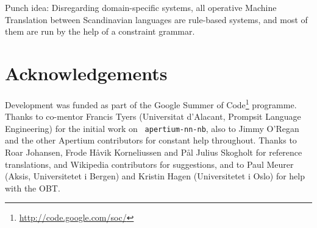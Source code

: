\documentclass[11pt]{article}
\newcommand{\comment}[1]{\textbf{SKRIV} {\it #1}}
\renewcommand{\comment}[1]{}
\begin{document}
\comment{den der mangla litt...punch. me treng ein slutt!}

Punch idea: Disregarding domain-specific systems, all operative Machine 
Translation between Scandinavian languages are rule-based systems, and 
most of them are run by the help of a constraint grammar.


\section*{Acknowledgements}

Development was funded as part of the Google Summer of
Code\footnote{\href{http://code.google.com/soc/}{http://code.google.com/soc/}
} programme. Thanks to co-mentor Francis Tyers (Universitat d'Alacant,
Prompsit Language Engineering) for the initial work on {\tt
  apertium-nn-nb}, also to Jimmy O'Regan and the other Apertium
contributors for constant help throughout. Thanks to Roar Johansen,
Frode Håvik Korneliussen and Pål Julius Skogholt for reference
translations, and Wikipedia contributors for suggestions, and to Paul
Meurer (Aksis, Universitetet i Bergen) and Kristin Hagen
(Universitetet i Oslo) for help with the OBT.




\end{document}

